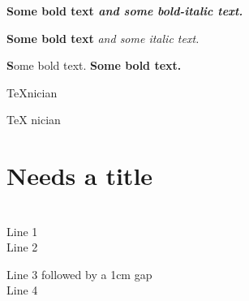 \documentclass{book}
\begin{document}
{\bfseries Some bold text \itshape and some bold-italic text.}

{\bfseries Some bold text} {\itshape and some italic text.}

\textbf Some bold text.
\textbf{Some bold text.}

\TeX nician

\TeX{} nician

\chapter{Needs a title} %
\chapter{} %

Line 1 \\Line 2

Line 3 followed by a 1cm gap \\[1cm]Line 4

\end{document}
